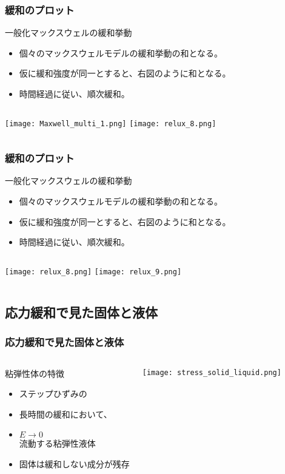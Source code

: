 \documentclass[12pt, dvipdfmx]{beamer}
\begin{document}
\begin{frame}
	\frametitle{緩和のプロット}
		\begin{alertblock}{一般化マックスウェルの緩和挙動}
			\begin{itemize}
				\item 個々のマックスウェルモデルの緩和挙動の和となる。
				\item 仮に緩和強度が同一とすると、右図のように和となる。
				\item 時間経過に従い、順次緩和。
			\end{itemize}
		\end{alertblock}
		\begin{columns}[T, onlytextwidth]
				\texttt{[image: Maxwell\_multi\_1.png]}
				\texttt{[image: relux\_8.png]}
		\end{columns}
\end{frame}

\begin{frame}
	\frametitle{緩和のプロット}
		\begin{alertblock}{一般化マックスウェルの緩和挙動}
			\begin{itemize}
				\item 個々のマックスウェルモデルの緩和挙動の和となる。
				\item 仮に緩和強度が同一とすると、右図のように和となる。
				\item 時間経過に従い、順次緩和。
			\end{itemize}
		\end{alertblock}
		\begin{columns}[T, onlytextwidth]
				\texttt{[image: relux\_8.png]}
				\texttt{[image: relux\_9.png]}
		\end{columns}
\end{frame}

\subsection{応力緩和で見た固体と液体}
\begin{frame}
	\frametitle{応力緩和で見た固体と液体}
		\begin{columns}[T, onlytextwidth]
				\begin{block}{粘弾性体の特徴}
					\begin{itemize}
						\item ステップひずみの
						\item 長時間の緩和において、
						\item $E \rightarrow 0$\\
						流動する粘弾性液体
						\item 固体は緩和しない成分が残存
					\end{itemize}
				\end{block}
				\texttt{[image: stress\_solid\_liquid.png]}
		\end{columns}
\end{frame}
\end{document}

